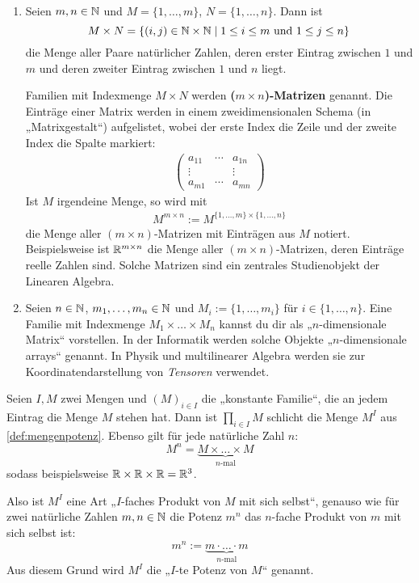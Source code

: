 \begin{bsp} \label{bsp:matrizen}  \quad
    \begin{enumerate}
        \item Seien $m,n\in \mathbb N$ und $M=\{1,\dots , m\}$, $N=\{1,\dots,n\}$. Dann ist
            \[ M\times N = \{ (i,j) \in \mathbb N\times \mathbb N \mid 1\le i\le m \ \text{und}\ 1\le j \le n \} \]
        die Menge aller Paare natürlicher Zahlen, deren erster Eintrag zwischen $1$ und $m$ und deren zweiter Eintrag zwischen $1$ und $n$ liegt.

        Familien mit Indexmenge $M\times N$ werden \textbf{($m\times n$)-Matrizen} genannt. Die Einträge einer Matrix werden in einem zweidimensionalen Schema (in „Matrixgestalt“) aufgelistet, wobei der erste Index die Zeile und der zweite Index die Spalte markiert:
        \begin{align*}
            \begin{pmatrix}
                a_{11} & \cdots & a_{1n} \\
                \vdots && \vdots \\
                a_{m1} & \cdots & a_{mn}
            \end{pmatrix}
        \end{align*}
        Ist $M$ irgendeine Menge, so wird mit
        \begin{align*}
            M^{m\times n} := M^{\{1,\dots , m\}\times \{1,\dots , n\}}
        \end{align*}
        die Menge aller $(m\times n)$-Matrizen mit Einträgen aus $M$ notiert. Beispielsweise ist $\mathbb R^{m\times n}$ die Menge aller $(m\times n)$-Matrizen, deren Einträge reelle Zahlen sind. Solche Matrizen sind ein zentrales Studienobjekt der Linearen Algebra.
        \item Seien $n\in \mathbb N$, $m_1,\dots , m_n\in \mathbb N$ und $M_i:=\{1,\dots , m_i\}$ für $i\in \{1,\dots , n\}$. Eine Familie mit Indexmenge $M_1\times\ldots\times M_n$ kannst du dir als „$n$-dimensionale Matrix“ vorstellen. In der Informatik werden solche Objekte „$n$-dimensionale arrays“ genannt. In Physik und multilinearer Algebra werden sie zur Koordinatendarstellung von \emph{Tensoren} verwendet.
    \end{enumerate}
\end{bsp}


\begin{bem}
    Seien $I,M$ zwei Mengen und $(M)_{i\in I}$ die „konstante Familie“, die an jedem Eintrag die Menge $M$ stehen hat. Dann ist $\prod_{i\in I} M$ schlicht die Menge $M^I$ aus \cref{def:mengenpotenz}. Ebenso gilt für jede natürliche Zahl $n$:
        \[ M^n = \underbrace{M\times\ldots\times M}_{\text{$n$-mal}} \]
    sodass beispielsweise $\mathbb R\times \mathbb R\times \mathbb R= \mathbb R^3$.

    Also ist $M^I$ eine Art „$I$-faches Produkt von $M$ mit sich selbst“, genauso wie für zwei natürliche Zahlen $m,n\in \mathbb N$ die Potenz $m^n$ das $n$-fache Produkt von $m$ mit sich selbst ist:
        \[ m^n := \underbrace{m\cdot\ldots\cdot m}_{\text{$n$-mal}}\]
    Aus diesem Grund wird $M^I$ die „$I$-te Potenz von $M$“ genannt.
\end{bem}


